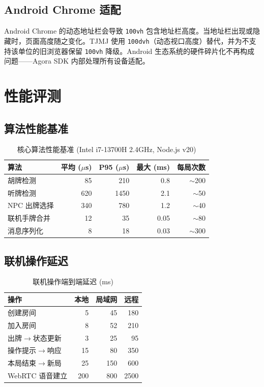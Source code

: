 \documentclass[11pt,a4paper]{article}
\begin{document}
\subsection{Android Chrome 适配}

Android Chrome 的动态地址栏会导致 \texttt{100vh} 包含地址栏高度。当地址栏出现或隐藏时，页面高度随之变化。TJMJ 使用 \texttt{100dvh}（动态视口高度）替代，并为不支持该单位的旧浏览器保留 \texttt{100vh} 降级。Android 生态系统的硬件碎片化不再构成问题——Agora SDK 内部处理所有设备适配。

\newpage
\section{性能评测}

\subsection{算法性能基准}

\begin{table}[H]
\centering
\caption{核心算法性能基准 (Intel i7-13700H 2.4GHz, Node.js v20)}
\label{tab:perf}
\small
\begin{tabular}{@{}lrrrr@{}}
\toprule
\textbf{算法} & \textbf{平均 ($\mu$s)} & \textbf{P95 ($\mu$s)} & \textbf{最大 (ms)} & \textbf{每局次数} \\
\midrule
胡牌检测 & 85 & 210 & 0.8 & $\sim$200 \\
听牌检测 & 620 & 1450 & 2.1 & $\sim$50 \\
NPC 出牌选择 & 340 & 780 & 1.2 & $\sim$40 \\
联机手牌合并 & 12 & 35 & 0.05 & $\sim$80 \\
消息序列化 & 8 & 18 & 0.03 & $\sim$300 \\
\bottomrule
\end{tabular}
\end{table}

\subsection{联机操作延迟}

\begin{table}[H]
\centering
\caption{联机操作端到端延迟 (ms)}
\label{tab:oplat}
\small
\begin{tabular}{@{}lrrr@{}}
\toprule
\textbf{操作} & \textbf{本地} & \textbf{局域网} & \textbf{远程} \\
\midrule
创建房间 & 5 & 45 & 180 \\
加入房间 & 8 & 52 & 210 \\
出牌$\to$状态更新 & 3 & 25 & 95 \\
操作提示$\to$响应 & 15 & 80 & 350 \\
本局结束$\to$新局 & 25 & 150 & 600 \\
WebRTC 语音建立 & 200 & 800 & 2500 \\
\bottomrule
\end{tabular}
\end{table}
\end{document}
